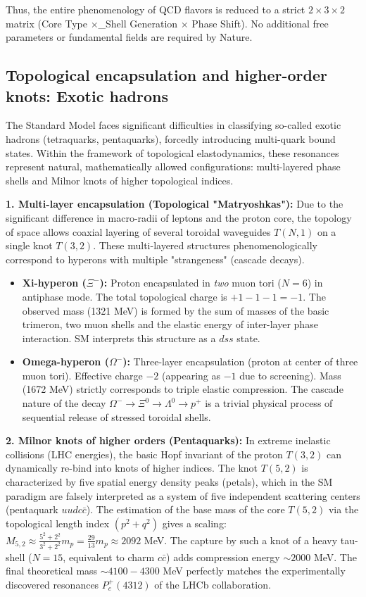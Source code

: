 \documentclass[11pt,a4paper]{article}
\begin{document}
Thus, the entire phenomenology of QCD flavors is reduced to a strict $2 \times 3 \times 2$ matrix (Core Type $\times$_Shell Generation $\times$ Phase Shift). No additional free parameters or fundamental fields are required by Nature.

\subsection{Topological encapsulation and higher-order knots: Exotic hadrons}
The Standard Model faces significant difficulties in classifying so-called exotic hadrons (tetraquarks, pentaquarks), forcedly introducing multi-quark bound states. Within the framework of topological elastodynamics, these resonances represent natural, mathematically allowed configurations: multi-layered phase shells and Milnor knots of higher topological indices.

\textbf{1. Multi-layer encapsulation (Topological "Matryoshkas"):}
Due to the significant difference in macro-radii of leptons and the proton core, the topology of space allows coaxial layering of several toroidal waveguides $T(N,1)$ on a single knot $T(3,2)$. These multi-layered structures phenomenologically correspond to hyperons with multiple "strangeness" (cascade decays).
\begin{itemize}
    \item \textbf{Xi-hyperon ($\Xi^-$):} Proton encapsulated in \textit{two} muon tori ($N=6$) in antiphase mode. The total topological charge is $+1 - 1 - 1 = -1$. The observed mass (1321 MeV) is formed by the sum of masses of the basic trimeron, two muon shells and the elastic energy of inter-layer phase interaction. SM interprets this structure as a $dss$ state.
    \item \textbf{Omega-hyperon ($\Omega^-$):} Three-layer encapsulation (proton at center of three muon tori). Effective charge $-2$ (appearing as $-1$ due to screening). Mass (1672 MeV) strictly corresponds to triple elastic compression. The cascade nature of the decay $\Omega^- \to \Xi^0 \to \Lambda^0 \to p^+$ is a trivial physical process of sequential release of stressed toroidal shells.
\end{itemize}

\textbf{2. Milnor knots of higher orders (Pentaquarks):}
In extreme inelastic collisions (LHC energies), the basic Hopf invariant of the proton $T(3,2)$ can dynamically re-bind into knots of higher indices. The knot $T(5,2)$ is characterized by five spatial energy density peaks (petals), which in the SM paradigm are falsely interpreted as a system of five independent scattering centers (pentaquark $uudc\bar{c}$).
The estimation of the base mass of the core $T(5,2)$ via the topological length index $(p^2+q^2)$ gives a scaling: $M_{5,2} \approx \frac{5^2+2^2}{3^2+2^2} m_p = \frac{29}{13} m_p \approx 2092$ MeV. The capture by such a knot of a heavy tau-shell ($N=15$, equivalent to charm $c\bar{c}$) adds compression energy $\sim 2000$ MeV. The final theoretical mass $\sim 4100-4300$ MeV perfectly matches the experimentally discovered resonances $P_c^+(4312)$ of the LHCb collaboration.
\end{document}

